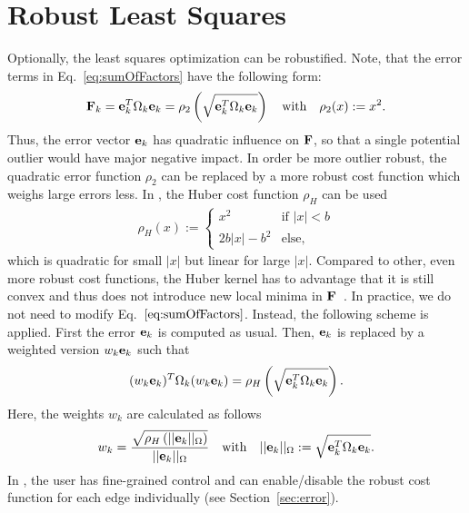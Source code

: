 \documentclass[a4paper]{article}
\begin{document}
\section{Robust Least Squares\label{sec:robust_kernel}}
Optionally, the least squares optimization can be robustified.
Note, that the error terms in Eq.~\ref{eq:sumOfFactors}  have the following form:
\begin{eqnarray}
\mathbf{F}_k = \mathbf{e}_k^T\Omega_k \mathbf{e}_k = \rho_2\left(\sqrt{\mathbf{e}_k^T\Omega_k \mathbf{e}_k}\right) \quad \text{with} \quad \rho_2(x):=x^2.
\end{eqnarray}
Thus, the error vector $\mathbf{e}_k$ has quadratic influence on $\mathbf{F}$,
so that a single potential outlier would have major negative impact.
In order be more outlier robust, the quadratic error function $\rho_2$
can be replaced by a more robust cost function which weighs large errors less.
In \gopt, the Huber cost function $\rho_H$ can be used
\begin{eqnarray}
\rho_H(x) := \begin{cases}
                 x^2         & \text{if } |x|<b\\
                  2b |x| - b^2          & \text{else},
   \end{cases}
\end{eqnarray}
which is quadratic for small $|x|$ but linear for large $|x|$. Compared to other,
even more robust cost functions, the Huber kernel has to advantage that it is
still convex and thus does not introduce new local minima in $\mathbf{F}$~\cite[pp.616]{Hartley:Zisserman:Book2004}.
In practice, we do not need to modify Eq.~$\ref{eq:sumOfFactors}$. Instead, the following scheme
is applied. First the  error $\mathbf{e}_k$ is computed as usual. Then, $\mathbf{e}_k$ is replaced by
a weighted version $w_k\mathbf{e}_k$ such that
\begin{eqnarray}
(w_k\mathbf{e}_k)^T\Omega_k (w_k\mathbf{e}_k) = \rho_H\left(\sqrt{\mathbf{e}_k^T\Omega_k \mathbf{e}_k}\right).
\end{eqnarray}
Here, the weights $w_k$ are calculated as follows
\begin{eqnarray}
w_k = \frac{\sqrt{\rho_H\left(||\mathbf{e}_k||_\Omega \right)}}{||\mathbf{e}_k||_\Omega } \quad \text{with} \quad ||\mathbf{e}_k||_\Omega := \sqrt{\mathbf{e}_k^T\Omega_k \mathbf{e}_k}.
\end{eqnarray}
In \gopt, the user has fine-grained control and can enable/disable the robust cost function for each edge individually (see Section~\ref{sec:error}).
\end{document}
